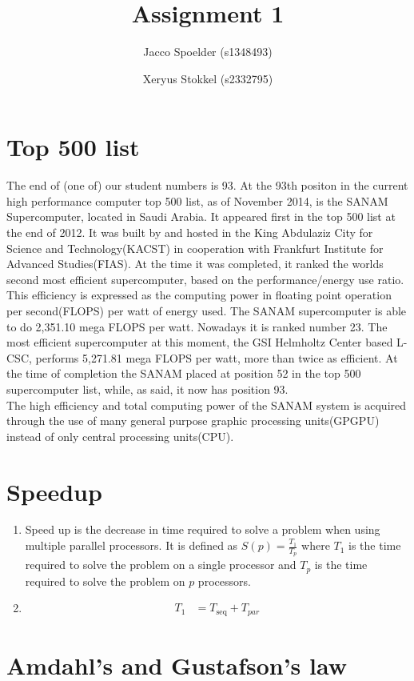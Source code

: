 \documentclass[a4paper]{article}
\title{Assignment 1}
\author{Jacco Spoelder (s1348493) \and Xeryus Stokkel (s2332795)}
\begin{document}
\maketitle

\section{Top 500 list}
The end of (one of) our student numbers is 93. At the 93th positon in the current high performance computer top 500 list, as of November 2014, is the SANAM Supercomputer, located in Saudi Arabia. It appeared first in the top 500 list at the end of 2012. It was built by and hosted in the King Abdulaziz City for Science and Technology(KACST) in cooperation with Frankfurt Institute for Advanced Studies(FIAS). At the time it was completed, it ranked the worlds second most efficient supercomputer, based on the performance/energy use ratio. This efficiency is expressed as the computing power in floating point operation per second(FLOPS) per watt of energy used. The SANAM supercomputer is able to do 2,351.10 mega FLOPS per watt. Nowadays it is ranked number 23. The most efficient supercomputer at this moment, the GSI Helmholtz Center based L-CSC, performs 5,271.81 mega FLOPS per watt, more than twice as efficient. At the time of completion the SANAM placed at position 52 in the top 500 supercomputer list, while, as said, it now has position 93. 
\\
The high efficiency and total computing power of the SANAM system is acquired through the use of many general purpose graphic processing units(GPGPU) instead of only central processing units(CPU).
\section{Speedup}
\begin{enumerate}[\textbf{(a)}]
	\item Speed up is the decrease in time required to solve a problem when using multiple parallel processors. It is defined as $S(p) = \frac{T_1}{T_p}$ where $T_1$ is the time required to solve the problem on a single processor and $T_p$ is the time required to solve the problem on $p$ processors.
	\item
		\begin{align}
			T_1 &= T_\text{seq} + T_{par}
		\end{align}
\end{enumerate}

\section{Amdahl's and Gustafson's law}
\end{document}
